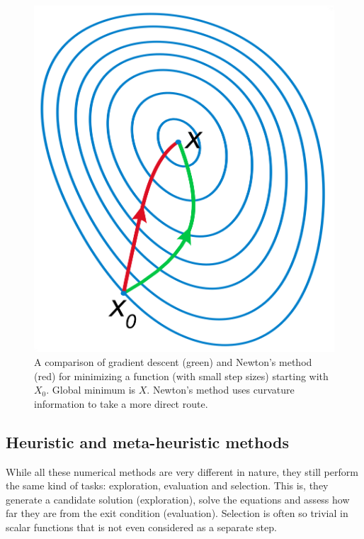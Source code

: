 \begin{figure}[H]
	\includegraphics[width=\textwidth]{./figures/04/gradientdescent.png}
	\caption[Gradient descent vs Newton's optimization]{A comparison of gradient descent (green) and Newton's method (red) for minimizing a function (with small step sizes) starting with $ X_{0} $. Global minimum is $ X $. Newton's method uses curvature information to take a more direct route.}
	\label{fig:gradientdescent}
\end{figure}

\subsection{Heuristic and meta-heuristic methods}
While all these numerical methods are very different in nature, they still perform the same kind of tasks: exploration, evaluation and selection. This is, they generate a candidate solution (exploration), solve the equations and assess how far they are from the exit condition (evaluation). Selection is often so trivial in scalar functions that is not even considered as a separate step.

